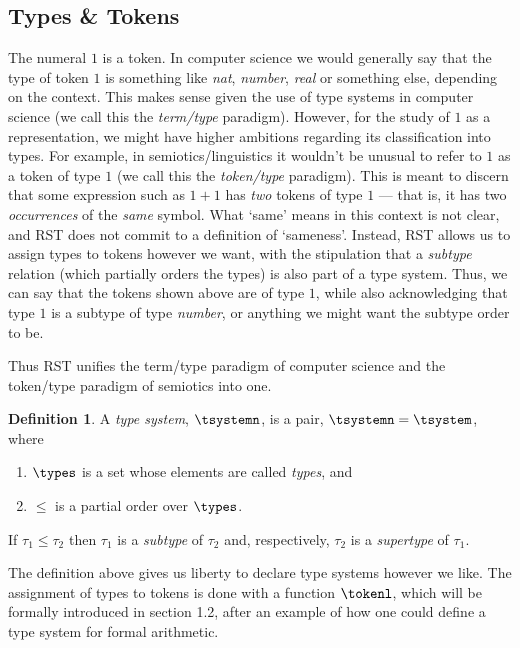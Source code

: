 \documentclass[a4paper]{article}
\theoremstyle{definition}
\newtheorem{definition}{Definition}
\begin{document}
	\subsection{Types \& Tokens}
		The numeral $1$ is a token. In computer science we would generally say that the type of token $1$ is something like \textit{nat}, \textit{number}, \textit{real} or something else, depending on the context. This makes sense given the use of type systems in computer science (we call this the \textit{term/type} paradigm). However, for the study of $1$ as a representation, we might have higher ambitions regarding its classification into types. For example, in semiotics/linguistics it wouldn't be unusual to refer to $1$ as a token of type $1$ (we call this the \textit{token/type} paradigm). This is meant to discern that some expression such as $1+1$ has \textit{two} tokens of type $1$ --- that is, it has two \textit{occurrences} of the \textit{same} symbol. What `same' means in this context is not clear, and RST does not commit to a definition of `sameness'. Instead, RST allows us to assign types to tokens however we want, with the stipulation that a \textit{subtype} relation (which partially orders the types) is also part of a type system. Thus, we can say that the tokens shown above are of type $1$, while also acknowledging that type $1$ is a subtype of type \textit{number}, or anything we might want the subtype order to be.
		
		Thus RST unifies the term/type paradigm of computer science and the token/type paradigm of semiotics into one.
		
		\begin{definition}\label{defn:typeSystem}
			A \textit{type system}, $\tsystemn$,  is a pair, $\tsystemn=\tsystem$,
			where
			\begin{enumerate}[itemsep=0pt,topsep=4pt]
				\item $\types$ is a set whose elements are called \textit{types}, and
				\item $\leq$ is a partial order over $\types$.
			\end{enumerate}
			If $\tau_1\leq \tau_2$ then $\tau_1$ is a \textit{subtype} of $\tau_2$ and, respectively, $\tau_2$ is a \textit{supertype} of $\tau_1$.
		\end{definition}
	
		The definition above gives us liberty to declare type systems however we like. The assignment of types to tokens is done with a function $\tokenl$, which will be formally introduced in section 1.2, after an example of how one could define a type system for formal arithmetic.
		
\end{document}
